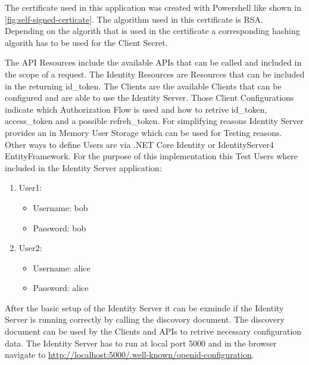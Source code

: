 The certificate used in this application was created with Powershell like shown in \ref{fig:self-signed-certicate}. The algorithm used in this certificate is RSA. Depending on the algorith that is used in the certificate a corresponding hashing algorith has to be used for the Client Secret.


The API Resources include the available APIs that can be called and included in the scope of a request. The Identity Resources are Resources that can be included in the returning id\_token. The Clients are the available Clients that can be configured and are able to use the Identity Server. Those Client Configurations indicate which Authorization Flow is used and how to retrive id\_token, access\_token and a possible refreh\_token. For simplifying reasons Identity Server provides an in Memory User Storage which can be used for Testing reasons. Other ways to define Users are via .NET Core Identity or IdentityServer4 EntityFramework. For the purpose of this implementation this Test Users where included in the Identity Server application:
\begin{enumerate}
	\item User1:
	\begin{itemize}
	\item  Username: bob
	\item  Password: bob
\end{itemize} 
	\item User2:
\begin{itemize}
	\item  Username: alice
	\item  Password: alice
\end{itemize} 
\end{enumerate}

After the basic setup of the Identity Server it can be exminde if the Identity Server is running correctly by calling the discovory document. The discovery document can be used by the Clients and APIs to retrive necessary configuration data. The Identity Server has to run at local port 5000 and in the browser navigate to
\url{http://localhost:5000/.well-known/openid-configuration}.

